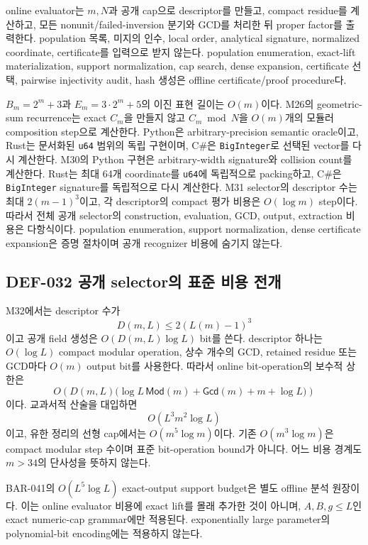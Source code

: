 \documentclass[11pt]{article}
\begin{document}
online evaluator는 \(m,N\)과 공개 cap으로 descriptor를 만들고, compact
residue를 계산하고, 모든 nonunit/failed-inversion 분기와 GCD를 처리한
뒤 proper factor를 출력한다. population 목록, 미지의 인수, local
order, analytical signature, normalized coordinate, certificate를 입력으로
받지 않는다. population enumeration, exact-lift materialization, support
normalization, cap search, dense expansion, certificate 선택, pairwise
injectivity audit, hash 생성은 offline certificate/proof procedure다.

\(B_m=2^m+3\)과 \(E_m=3\cdot2^m+5\)의 이진 표현 길이는 \(O(m)\)이다.
M26의 geometric-sum recurrence는 exact \(C_m\)을 만들지 않고
\(C_m\bmod N\)을 \(O(m)\)개의 모듈러 composition step으로 계산한다.
Python은 arbitrary-precision semantic oracle이고, Rust는 문서화된
\texttt{u64} 범위의 독립 구현이며, C\#은 \texttt{BigInteger}로 선택된
vector를 다시 계산한다. M30의 Python 구현은 arbitrary-width
signature와 collision count를 계산한다. Rust는 최대 64개 coordinate를
\texttt{u64}에 독립적으로 packing하고, C\#은 \texttt{BigInteger}
signature를 독립적으로 다시 계산한다.
M31 selector의 descriptor 수는 최대 \(2(m-1)^3\)이고, 각 descriptor의
compact 평가 비용은 \(O(\log m)\) step이다. 따라서 전체 공개
selector의 construction, evaluation, GCD, output, extraction 비용은
다항식이다. population enumeration, support normalization, dense
certificate expansion은 증명 절차이며 공개 recognizer 비용에
숨기지 않는다.
\subsection{DEF-032 공개 selector의 표준 비용 전개}

M32에서는 descriptor 수가
\[
D(m,L)\le2(L(m)-1)^3
\]
이고 공개 field 생성은 \(O(D(m,L)\log L)\) bit를 쓴다. descriptor
하나는 \(O(\log L)\) compact modular operation, 상수 개수의 GCD,
retained residue 또는 GCD마다 \(O(m)\) output bit를 사용한다. 따라서
online bit-operation의 보수적 상한은
\[
O\!\left(
D(m,L)\bigl(
\log L\,\mathsf{Mod}(m)+\mathsf{Gcd}(m)+m+\log L
\bigr)\right)
\]
이다. 교과서적 산술을 대입하면
\[
O(L^3m^2\log L)
\]
이고, 유한 정리의 선형 cap에서는 \(O(m^5\log m)\)이다. 기존
\(O(m^3\log m)\)은 compact modular step 수이며 표준 bit-operation
bound가 아니다. 어느 비용 경계도 \(m>34\)의 단사성을 뜻하지 않는다.

BAR-041의 \(O(L^5\log L)\) exact-output support budget은 별도 offline
분석 원장이다. 이는 online evaluator 비용에 exact lift를 몰래
추가한 것이 아니며, \(A,B,g\le L\)인 exact numeric-cap grammar에만
적용된다. exponentially large parameter의 polynomial-bit encoding에는
적용하지 않는다.
\end{document}
